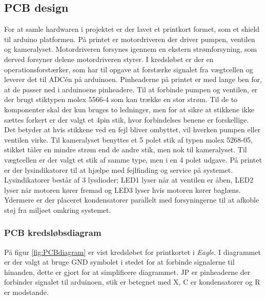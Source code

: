  
\subsection{PCB design} 
For at samle hardwaren i projektet er der lavet et printkort formet, som et shield til arduino platformen. På printet er motordriveren der driver pumpen, ventilen og kameralyset. Motordriveren forsynes igennem en ekstern strømforsyning, som derved forsyner delene motordriveren styrer. I kredsløbet er der en operationsforstærker, som har til opgave at forstærke signalet fra vægtcellen og leverer det til ADCén på arduinoen. Pinheaderne på printet er med lange ben for, at de passer ned i arduinoens pinheadere. Til at forbinde pumpen og ventilen, er der brugt stiktypen molex 5566-4 som kan trække en stor strøm. Til de to komponenter skal der kun bruges to ledninger, men for at sikre at stikkene ikke sættes forkert er der valgt et 4pin stik, hvor forbindelses benene er forskellige. Det betyder at hvis stikkene ved en fejl bliver ombyttet, vil hverken pumpen eller ventilen virke. Til kameralyset benyttes et 5 polet stik af typen molex 5268-05, stikket tåler en mindre strøm end de andre stik, men nok til kameralyset. Til vægtcellen er der valgt et stik af samme type, men i en 4 polet udgave. På printet er der lysindikatorer til at hjælpe med fejlfinding og service på systemet. Lysindikatorer består af 3 lysdioder; LED1 lyser når at ventilen er åben, LED2 lyser når motoren kører fremad og LED3 lyser hvis motoren kører baglæns. Ydermere er der placeret kondensatorer parallelt med forsyningerne til at afkoble støj fra miljøet omkring systemet.

\newpage
\subsubsection{PCB kredsløbsdiagram}
På figur \ref{fig:PCBdiagram} er vist kredsløbet for printkortet i \textit{Eagle}. I diagrammet er der valgt at bruge GND symbolet i stedet for at forbinde signalerne til hinanden, dette er gjort for at simplificere diagrammet. JP er pinheaderne der forbinder signalet til arduinoen, stik er betegnet med X, C er kondensatorer og R er modstande.

